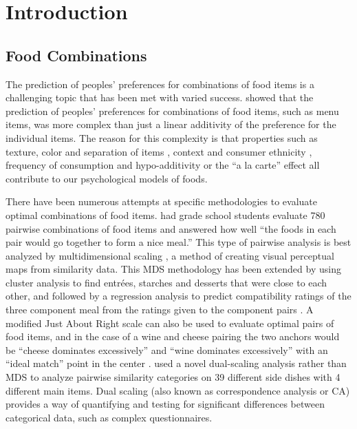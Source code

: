 \chapter{Introduction}

\section{Food Combinations}
The prediction of peoples’ preferences for combinations of food items is a challenging topic that has been met with varied success.  \citet{Eindhoven1959} showed that the prediction of peoples’ preferences for combinations of food items, such as menu items, was more complex than just a linear additivity of the preference for the individual items.  The reason for this complexity is that properties such as texture, color and separation of items \citep{Eindhoven1959,Pilgrim1961}, context and consumer ethnicity \citep*{Marshall2003,Niewind1986}, frequency of consumption \citep{Marshall2003} and hypo-additivity or the “a la carte” effect \citep{Lawless1994} all contribute to our psychological models of foods.

There have been numerous attempts at specific methodologies to evaluate optimal combinations of food items.  \citet{Worsley1984} had grade school students evaluate 780 pairwise combinations of food items and answered how well “the foods in each pair would go together to form a nice meal.” This type of pairwise analysis is best analyzed by multidimensional scaling \citep{Schiffman1981}, a method of creating visual perceptual maps from similarity data. This MDS methodology has been extended by using cluster analysis to find entr\'{e}es, starches and desserts that were close to each other, and followed by a regression analysis to predict compatibility ratings of the three component meal from the ratings given to the component pairs \citep{Klarman1977}.  A modified Just About Right scale \citep{Johnson1987} can also be used to evaluate optimal pairs of food items, and in the case of a wine and cheese pairing the two anchors would be “cheese dominates excessively” and “wine dominates excessively” with an “ideal match” point in the center \citep{King2005}.  \citeauthor{Niewind1986} \citep{Niewind1986} used a novel dual-scaling analysis \citep{Nishisato1984} rather than MDS to analyze pairwise similarity categories on 39 different side dishes with 4 different main items.  Dual scaling (also known as correspondence analysis or CA) provides a way of quantifying and testing for significant differences between categorical data, such as complex questionnaires.

